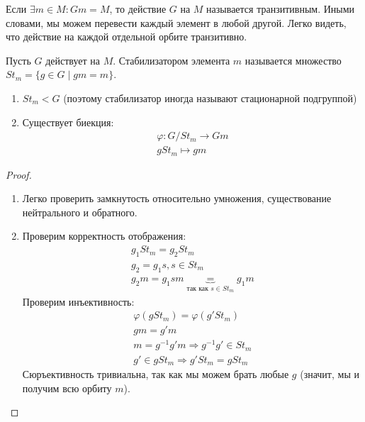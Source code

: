 Если $\exists m \in M : Gm = M$, то действие $G$ на $M$ называется транзитивным. 
Иными словами, мы можем перевести каждый элемент в любой другой. 
Легко видеть, что действие на каждой отдельной орбите транзитивно.

\begin{conj}
    Пусть $G$ действует на $M$. 
    Стабилизатором элемента $m$ называется множество $St_m = \{ g \in G \; | \; gm = m \}$.
\end{conj}

\begin{theorem} \quad 

    \begin{enumerate}
        \item $St_m < G$ (поэтому стабилизатор иногда называют стационарной подгруппой) 
        \item Существует биекция: 
        \begin{gather*}
            \varphi: G / St_m \to Gm \\
            gSt_m \mapsto gm
        \end{gather*}
    \end{enumerate}
\end{theorem}
\begin{proof} \quad \\
    \begin{enumerate}
        \item Легко проверить замкнутость относительно умножения, существование нейтрального и обратного.
        \item Проверим корректность отображения:
        \begin{gather*}
            g_1St_m = g_2St_m \\
            g_2 = g_1s, s \in St_m \\
            g_2m = g_1sm \underbrace{=}_{\text{так как } s \in St_m} g_1m
        \end{gather*}
        Проверим инъективность:
        \begin{gather*}
            \varphi(gSt_m) = \varphi(g'St_m) \\
            gm = g'm \\
            m = g^{-1}g'm \Rightarrow g^{-1}g' \in St_m \\
            g'\in gSt_m \Rightarrow g'St_m = gSt_m
        \end{gather*}
        Сюръективность тривиальна, так как мы можем брать любые $g$ (значит, мы и получим всю орбиту $m$).
    \end{enumerate}
\end{proof}

